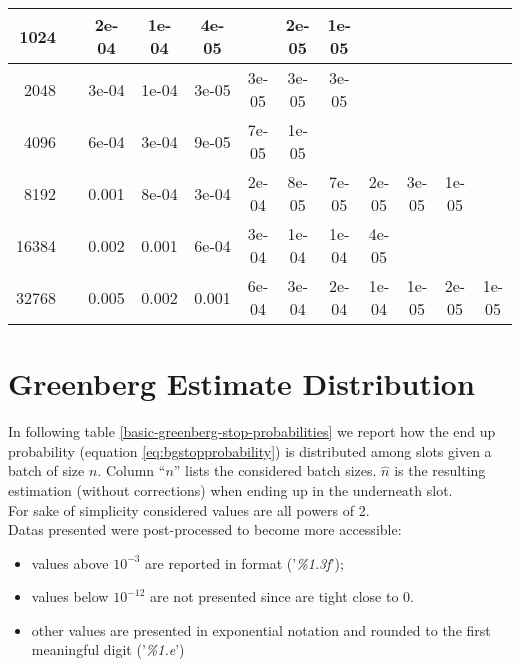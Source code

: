 \begin{appendices}
\begin{table}[H]
{\begin{tabular}{r|ccccccccccc}
1024 &&2e-04 &1e-04 &4e-05 &&2e-05 &1e-05 &&&&\\\hline

2048 &&3e-04 &1e-04 &3e-05 &3e-05 &3e-05 &3e-05 &&&&\\\hline

4096 &&6e-04 &3e-04 &9e-05 &7e-05 &1e-05 &&&&&\\\hline

8192 &&0.001 &8e-04 &3e-04 &2e-04 &8e-05 &7e-05 &2e-05 &3e-05 &1e-05 &\\\hline

16384 &&0.002 &0.001 &6e-04 &3e-04 &1e-04 &1e-04 &4e-05 &&&\\\hline

32768 &&0.005 &0.002 &0.001 &6e-04 &3e-04 &2e-04 &1e-04 &1e-05 &2e-05 &1e-05\\\hline

\end{tabular}
}
\end{table}

%
%
%
%

\section{Greenberg Estimate Distribution}
In following table \ref{basic-greenberg-stop-probabilities} we report how the end  up probability (equation \ref{eq:bgstopprobability}) is distributed among slots given a batch of size $n$.  Column ``$n$'' lists  the considered batch sizes. $\hat{n}$ is the resulting estimation (without corrections) when ending up in the underneath slot.\\  For sake of simplicity considered values are all powers of 2.\\
Datas presented were post-processed to become more accessible:
\begin{itemize}
\item values above $10^{-3}$ are reported in format ('\emph{\%1.3f}');
\item values below $10^{-12}$ are not presented since are tight close to 0.
\item other values are presented in exponential notation and rounded to the first meaningful digit ('\emph{\%1.e}')
\end{itemize}


\clearpage
\thispagestyle{plain}
\begin{sidewaystable}
\flushleft
{}
\end{sidewaystable}
\end{appendices}
